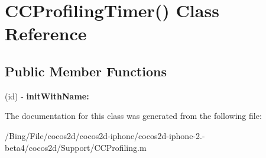 \hypertarget{interface_c_c_profiling_timer_07_08}{\section{C\-C\-Profiling\-Timer() Class Reference}
\label{interface_c_c_profiling_timer_07_08}
}
\subsection*{Public Member Functions}
\begin{DoxyCompactItemize}
\item 
\hypertarget{interface_c_c_profiling_timer_07_08_aa8c3cac4222b7226f517e6707cf06f3c}{(id) -\/ {\bfseries init\-With\-Name\-:}}\label{interface_c_c_profiling_timer_07_08_aa8c3cac4222b7226f517e6707cf06f3c}

\end{DoxyCompactItemize}


The documentation for this class was generated from the following file\-:\begin{DoxyCompactItemize}
\item 
/\-Bing/\-File/cocos2d/cocos2d-\/iphone/cocos2d-\/iphone-\/2.-\/beta4/cocos2d/\-Support/C\-C\-Profiling.\-m\end{DoxyCompactItemize}
